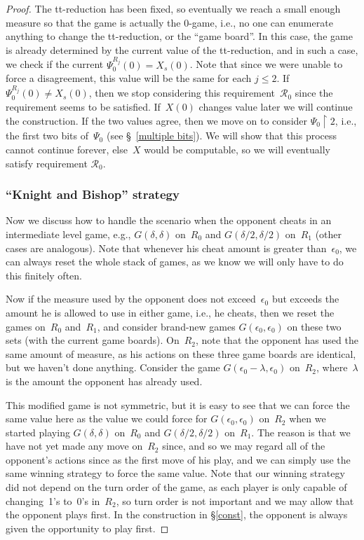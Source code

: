 \documentclass{LMCS}
\def\res{\!\!\upharpoonright\!}     \def\eres{\!\upharpoonright\!}     \def\nes{n_{e,s}}
\newcommand{\0}{\mathbf{0}}
\newcommand{\<}{\langle}
\renewcommand{\>}{\rangle}
\begin{document}
\begin{proof}
The tt-reduction has been fixed, so eventually we reach a small enough
measure so that the game is actually the $0$-game, i.e., no one can enumerate
anything to change the tt-reduction, or the ``game board''. In this case, the
game is already determined by the current value of the tt-reduction, and in
such a case, we check if the current $\Psi_0^{R_j}(0)=X_s(0)$.  Note that
since we were unable to force a disagreement, this value will be the same for
each $j \le 2$.  If $\Psi_0^{R_j}(0)\neq X_s(0)$, then we stop considering
this requirement~$\mathcal{R}_0$ since the requirement seems to be satisfied.
If~$X(0)$ changes value later we will continue the construction. If the two
values agree, then we move on to consider $\Psi_0\res 2$, i.e., the first two
bits of~$\Psi_0$ (see \S~\ref{multiple bits}).  We will show that this
process cannot continue forever, else~$X$ would be computable, so we will
eventually satisfy requirement $\mathcal{R}_0$.


\subsubsection{``Knight and Bishop'' strategy}\label{bishop}

Now we discuss how to handle the scenario when the opponent cheats in an
intermediate level game, e.g., $G(\delta,\delta)$ on~$R_0$ and
$G(\delta/2,\delta/2)$ on~$R_1$ (other cases are analogous). Note that
whenever his cheat amount is greater than~$\epsilon_0$, we can always reset
the whole stack of games, as we know we will only have to do this finitely
often.

Now if the measure used by the opponent does not exceed~$\epsilon_0$ but
exceeds the amount he is allowed to use in either game, i.e., he cheats, then
we reset the games on~$R_0$ and~$R_1$, and consider brand-new games
$G(\epsilon_0,\epsilon_0)$ on these two sets (with the current game boards).
On~$R_2$, note that the opponent has used the same amount of measure, as his
actions on these three game boards are identical, but we haven't done
anything.  Consider the game $G(\epsilon_0-\lambda,\epsilon_0)$ on~$R_2$,
where~$\lambda$ is the amount the opponent has already used.

This modified game is not symmetric, but it is easy to see that we can force
the same value here as the value we could force for
$G(\epsilon_0,\epsilon_0)$ on~$R_2$ when we started playing
$G(\delta,\delta)$ on~$R_0$ and $G(\delta/2,\delta/2)$ on~$R_1$. The reason
is that we have not yet made any move on~$R_2$ since, and so we may regard
all of the opponent's actions since as the first move of his play, and we can
simply use the same winning strategy to force the same value. Note that our
winning strategy did not depend on the turn order of the game, as each player
is only capable of changing~1's to~0's in~$R_2$, so turn order is not
important and we may allow that the opponent plays first. In the construction
in \S\ref{const}, the opponent is always given the opportunity to play first.


\end{proof}
\end{document}
